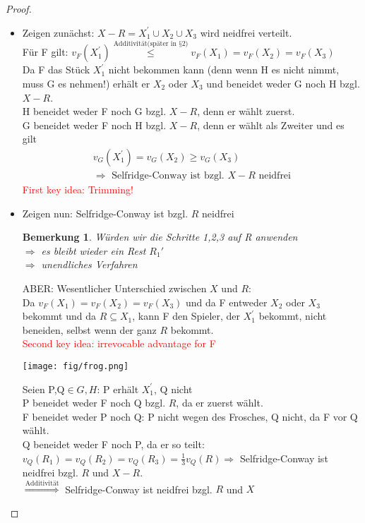 \documentclass[a4paper,10pt]{scrartcl}
\newtheorem*{bemerkung*}{Bemerkung}
\begin{document}
\begin{proof}
 \begin{itemize}
  \item Zeigen zunächst: $X-R=X_1^{'}\cup X_2\cup X_3$ wird neidfrei verteilt.\\
        Für F gilt: $v_F(X_1^{'})\stackrel{\text{Additivität(später in §2)}}{\leq}v_F(X_1)=v_F(X_2)=v_F(X_3)$\\
        Da F das Stück $X_1^{'}$ nicht bekommen kann (denn wenn H es nicht nimmt, muss G es nehmen!) erhält er $X_2$ oder $X_3$ und beneidet
        weder G noch H bzgl. $X-R$.\\
        H beneidet weder F noch G bzgl. $X-R$, denn er wählt zuerst.\\
        G beneidet weder F noch H bzgl. $X-R$, denn er wählt als Zweiter und es gilt
        \begin{align*}
         v_G(X_1^{'})=v_G(X_2)\geq v_G(X_3)\\\Rightarrow\text{ Selfridge-Conway ist bzgl. }X-R\text{ neidfrei}
        \end{align*}
        \textcolor{red}{First key idea: Trimming!}
  \item Zeigen nun: Selfridge-Conway ist bzgl. $R$ neidfrei
        \begin{bemerkung*}
         Würden wir die Schritte 1,2,3 auf R anwenden\\
         $\Rightarrow$ es bleibt wieder ein Rest $R_1{'}$\\
         $\Rightarrow$ unendliches Verfahren
        \end{bemerkung*}
        ABER: Wesentlicher Unterschied zwischen $X$ und $R$:\\
        Da $v_F(X_1)=v_F(X_2)=v_F(X_3)$ und da F entweder $X_2$ oder $X_3$ bekommt und da $R\subseteq X_1$, kann F den Spieler, der 
        $X_1^{'}$ bekommt, nicht beneiden, selbst wenn der ganz $R$ bekommt.\\
        \textcolor{red}{Second key idea: irrevocable advantage for F} \\
        \begin{center}
         \texttt{[image: fig/frog.png]}
        \end{center}
        Seien P,Q$\in{G,H}$: P erhält $X_1^{'}$, Q nicht\\
        P beneidet weder F noch Q bzgl. $R$, da er zuerst wählt.\\
        F beneidet weder P noch Q: P nicht wegen des Frosches, Q nicht, da F vor Q wählt. \\
        Q beneidet weder F noch P, da er so teilt: $v_Q(R_1)=v_Q(R_2)=v_Q(R_3)=\frac{1}{3}v_Q(R) \Rightarrow$ Selfridge-Conway ist neidfrei bzgl.
        $R$ und $X-R$.\\ $\stackrel{\text{Additivität}}{\Rightarrow}$ Selfridge-Conway ist neidfrei bzgl. $R$ und $X$
 \end{itemize}
\end{proof}
\end{document}

